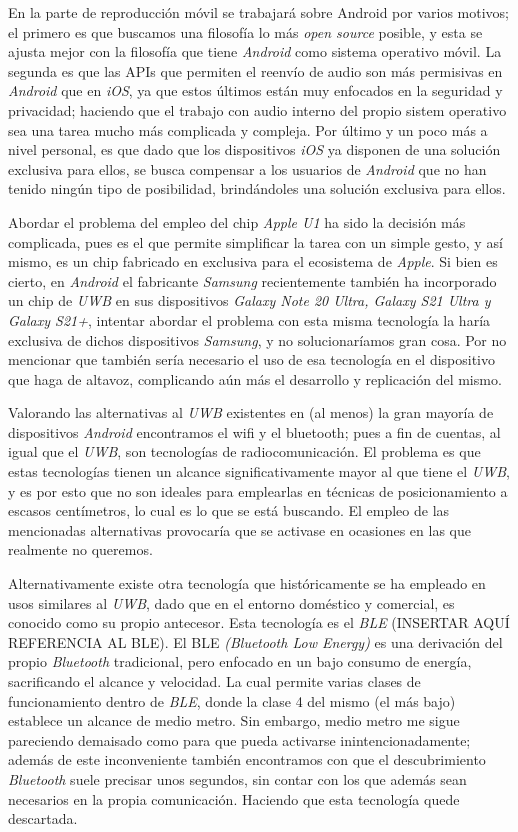 En la parte de reproducción móvil se trabajará sobre Android por varios motivos;
el primero es que buscamos una filosofía lo más \emph{open source} posible, y
esta se ajusta mejor con la filosofía que tiene \emph{Android} como sistema
operativo móvil. La segunda es que las APIs que permiten el reenvío de audio son
más permisivas en \emph{Android} que en \emph{iOS}, ya que estos últimos están
muy enfocados en la seguridad y privacidad; haciendo que el trabajo con audio
interno del propio sistem operativo sea una tarea mucho más complicada y
compleja. Por último y un poco más a nivel personal, es que dado que los
dispositivos \emph{iOS} ya disponen de una solución exclusiva para ellos, se
busca compensar a los usuarios de \emph{Android} que no han tenido ningún tipo
de posibilidad, brindándoles una solución exclusiva para ellos.

Abordar el problema del empleo del chip \emph{Apple U1} ha sido la decisión más
complicada, pues es el que permite simplificar la tarea con un simple gesto, y
así mismo, es un chip fabricado en exclusiva para el ecosistema de \emph{Apple}.
Si bien es cierto, en \emph{Android} el fabricante \emph{Samsung} recientemente
también ha incorporado un chip de \emph{UWB} en sus dispositivos \emph{Galaxy
Note 20 Ultra, Galaxy S21 Ultra y Galaxy S21+}, intentar abordar el problema con
esta misma tecnología la haría exclusiva de dichos dispositivos \emph{Samsung},
y no solucionaríamos gran cosa. Por no mencionar que también sería necesario el
uso de esa tecnología en el dispositivo que haga de altavoz, complicando aún más
el desarrollo y replicación del mismo.

Valorando las alternativas al \emph{UWB} existentes en (al menos) la gran
mayoría de dispositivos \emph{Android} encontramos el wifi y el bluetooth; pues
a fin de cuentas, al igual que el \emph{UWB}, son tecnologías de
radiocomunicación. El problema es que estas tecnologías tienen un alcance
significativamente mayor al que tiene el \emph{UWB}, y es por esto que no son
ideales para emplearlas en técnicas de posicionamiento a escasos centímetros, lo
cual es lo que se está buscando. El empleo de las mencionadas alternativas
provocaría que se activase en ocasiones en las que realmente no queremos.

Alternativamente existe otra tecnología que históricamente se ha empleado en
usos similares al \emph{UWB}, dado que en el entorno doméstico y comercial, es
conocido como su propio antecesor. Esta tecnología es el \emph{BLE} (INSERTAR
AQUÍ REFERENCIA AL BLE). El BLE \emph{(Bluetooth Low Energy)} es una derivación
del propio \emph{Bluetooth} tradicional, pero enfocado en un bajo consumo de
energía, sacrificando el alcance y velocidad. La cual permite varias clases de
funcionamiento dentro de \emph{BLE}, donde la clase 4 del mismo (el más bajo)
establece un alcance de medio metro. Sin embargo, medio metro me sigue
pareciendo demaisado como para que pueda activarse inintencionadamente; además
de este inconveniente también encontramos con que el descubrimiento
\emph{Bluetooth} suele precisar unos segundos, sin contar con los que
además sean necesarios en la propia comunicación. Haciendo que esta tecnología
quede descartada.

